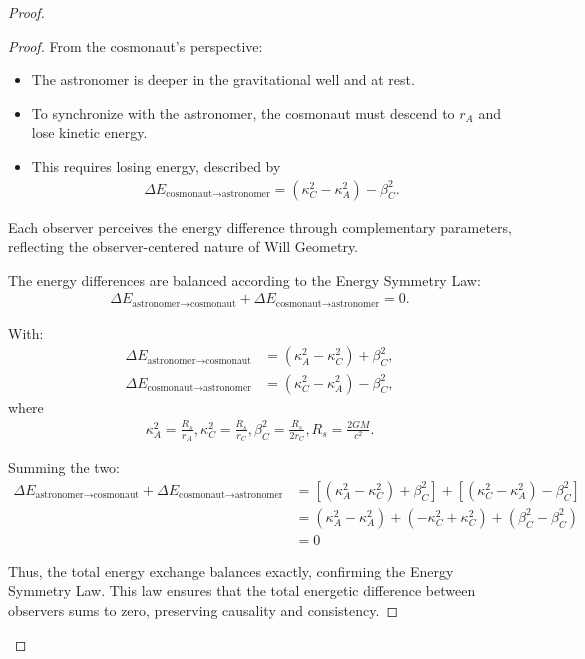 \documentclass{article}
\begin{document}
\begin{proof}
\begin{proof}
From the cosmonaut's perspective:
\begin{itemize}
\item The astronomer is deeper in the gravitational well and at rest.
\item To synchronize with the astronomer, the cosmonaut must descend to $r_A$ and lose kinetic energy.
\item This requires losing energy, described by
\begin{align}
\Delta E_{\text{cosmonaut}\rightarrow\text{astronomer}} = (\kappa^2_C - \kappa^2_A) - \beta^2_C.
\end{align}
\end{itemize}

Each observer perceives the energy difference through complementary parameters, reflecting the observer-centered nature of Will Geometry.

The energy differences are balanced according to the Energy Symmetry Law:
\begin{align}
\Delta E_{\text{astronomer}\rightarrow\text{cosmonaut}} + \Delta E_{\text{cosmonaut}\rightarrow\text{astronomer}} = 0.
\end{align}

With:
\begin{align}
\Delta E_{\text{astronomer}\rightarrow\text{cosmonaut}} &= (\kappa^2_A - \kappa^2_C) + \beta^2_C, \\
\Delta E_{\text{cosmonaut}\rightarrow\text{astronomer}} &= (\kappa^2_C - \kappa^2_A) - \beta^2_C,
\end{align}
where
\begin{align}
\kappa^2_A = \frac{R_s}{r_A}, \kappa^2_C = \frac{R_s}{r_C}, \beta^2_C = \frac{R_s}{2r_C}, R_s = \frac{2GM}{c^2}.
\end{align}

Summing the two:
\begin{align}
\Delta E_{\text{astronomer}\rightarrow\text{cosmonaut}} + \Delta E_{\text{cosmonaut}\rightarrow\text{astronomer}} &= [(\kappa^2_A - \kappa^2_C) + \beta^2_C] + [(\kappa^2_C - \kappa^2_A) - \beta^2_C] \\
&= (\kappa^2_A - \kappa^2_A) + (-\kappa^2_C + \kappa^2_C) + (\beta^2_C - \beta^2_C) \\
&= 0
\end{align}

Thus, the total energy exchange balances exactly, confirming the Energy Symmetry Law. This law ensures that the total energetic difference between observers sums to zero, preserving causality and consistency.


\end{proof}
\end{proof}
\end{document}
